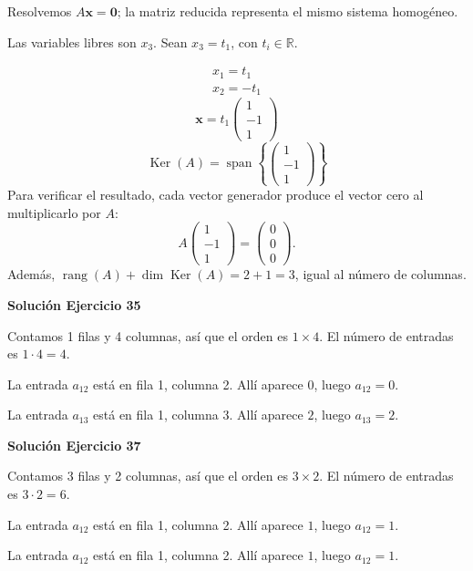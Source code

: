 \documentclass[12pt]{article}
\theoremstyle{remark}
\newcommand{\rang}{\operatorname{rang}}
\newcommand{\Ker}{\operatorname{Ker}}
\newcommand{\vect}[1]{\boldsymbol{#1}}
\begin{document}
Resolvemos $A\vect x=\vect0$; la matriz reducida representa el mismo sistema homogéneo.

Las variables libres son $x_{3}$. Sean $x_{3}=t_{1}$, con $t_i\in\mathbb R$.

\[
\begin{aligned}x_{1}=t_{1}\\x_{2}=- t_{1}\end{aligned}
\]
\[
\vect x=t_{1}\begin{pmatrix}1\\-1\\1\end{pmatrix}
\]
\[
\boxed{\Ker(A)=\operatorname{span}\left\{\begin{pmatrix}1\\-1\\1\end{pmatrix}\right\}}
\]
Para verificar el resultado, cada vector generador produce el vector cero al multiplicarlo por $A$:
\[
A\begin{pmatrix}1\\-1\\1\end{pmatrix}=\begin{pmatrix}0\\0\\0\end{pmatrix}.
\]
Además, $\rang(A)+\dim\Ker(A)=2+1=3$, igual al número de columnas.


\par\bigskip\noindent\textbf{Solución Ejercicio 35}\par\nobreak
Contamos 1 filas y 4 columnas, así que el orden es $1\times4$. El número de entradas es $1\cdot 4=4$.

La entrada $a_{12}$ está en fila 1, columna 2. Allí aparece $0$, luego $\boxed{a_{12}=0}$.

La entrada $a_{13}$ está en fila 1, columna 3. Allí aparece $2$, luego $\boxed{a_{13}=2}$.


\par\bigskip\noindent\textbf{Solución Ejercicio 37}\par\nobreak
Contamos 3 filas y 2 columnas, así que el orden es $3\times2$. El número de entradas es $3\cdot 2=6$.

La entrada $a_{12}$ está en fila 1, columna 2. Allí aparece $1$, luego $\boxed{a_{12}=1}$.

La entrada $a_{12}$ está en fila 1, columna 2. Allí aparece $1$, luego $\boxed{a_{12}=1}$.
\end{document}
